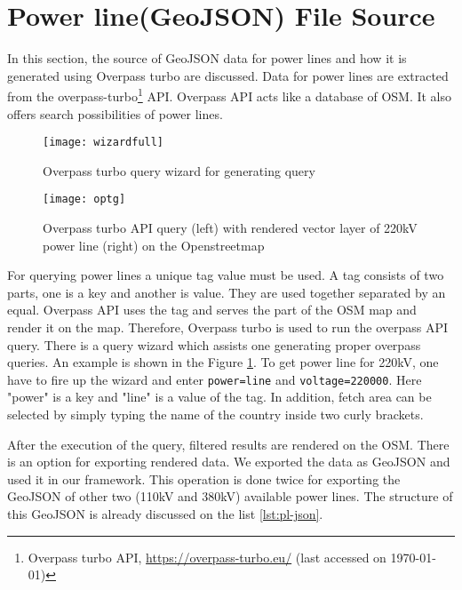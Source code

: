 \section{Power line(GeoJSON) File Source}
\label{sec:plsource}

In this section, the source of GeoJSON data for power lines and how it is generated using Overpass turbo are discussed.
Data for power lines are extracted from the overpass-turbo\footnote{Overpass turbo API, \url{https://overpass-turbo.eu/} (last accessed on {\today})} API. Overpass API acts like a database of OSM. It also offers search possibilities of power lines. 

\begin{figure}
  \begin{center}
    \texttt{[image: wizardfull]}
    \caption{Overpass turbo query wizard for generating query}
    \label{fig:wizard}
  \end{center}
\end{figure} 

\begin{figure} [H]
  \begin{center}
    \texttt{[image: optg]}
    \caption{Overpass turbo API query (left) with rendered vector layer of 220kV power line (right) on the Openstreetmap}
    \label{fig:optg}
  \end{center}
\end{figure} 

For querying power lines a unique tag value must be used. A tag consists of two parts, one is a key and another is value. They are used together separated by an equal. Overpass API uses the tag and serves the part of the OSM map and render it on the map. Therefore, Overpass turbo is used to run the overpass API query. There is a query wizard which assists one generating proper overpass queries. An example is shown in the Figure \ref{fig:wizard}. To get power line for 220kV, one have to fire up the wizard and enter \texttt{power=line} and \texttt{voltage=220000}. Here "power" is a key and "line" is a value of the tag. In addition, fetch area can be selected by simply typing the name of the country inside two curly brackets.
  
After the execution of the query, filtered results are rendered on the OSM. There is an option for exporting rendered data. We exported the data as GeoJSON and used it in our framework. This operation is done twice for exporting the GeoJSON of other two (110kV and 380kV) available power lines. The structure of this GeoJSON is already discussed on the list \ref{lst:pl-json}.

 